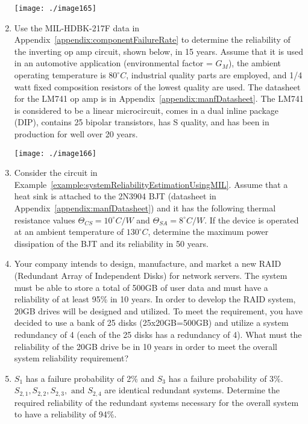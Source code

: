 \begin{enumerate}
\texttt{[image: ./image165]}

\item
  Use the MIL-HDBK-217F data in 
  Appendix~\ref{appendix:componentFailureRate} to determine the reliability
  of the inverting op amp circuit, shown below, in 15 years. Assume that
  it is used in an automotive application (environmental factor =
 $G_M$), the ambient operating temperature is
$80^\circ C$, industrial quality parts are employed, and 1/4
  watt fixed composition resistors of the lowest quality are used. The
  datasheet for the LM741 op amp is in Appendix~\ref{appendix:manfDatasheet}. 
  The LM741 is
  considered to be a linear microcircuit, comes in a dual inline package
  (DIP), contains 25 bipolar transistors, has S quality, and has been in
  production for well over 20 years.

\texttt{[image: ./image166]}

\item
  Consider the circuit in Example~\ref{example:systemReliabilityEstimationUsingMIL}. 
  Assume that a heat sink is
  attached to the 2N3904 BJT (datasheet in 
  Appendix~\ref{appendix:manfDatasheet}) and it has the
  following thermal resistance values
$\Theta_{CS} = 10^\circ C/W$ and $\Theta_{SA} = 8 ^\circ C/W$. 
If the device is operated at
  an ambient temperature of $130^\circ C$, determine the maximum power
  dissipation of the BJT and its reliability in 50 years.
\item
  Your company intends to design, manufacture, and market a new RAID
  (Redundant Array of Independent Disks) for network servers. The system
  must be able to store a total of 500GB of user data and must have a
  reliability of at least 95\% in 10 years. In order to develop the RAID
  system, 20GB drives will be designed and utilized. To meet the
  requirement, you have decided to use a bank of 25 disks
  (25x20GB=500GB) and utilize a system redundancy of 4 (each of the 25
  disks has a redundancy of 4). What must the reliability of the 20GB
  drive be in 10 years in order to meet the overall system reliability
  requirement?
  
  
\item
  $S_1$ has a failure probability of  2\% and $S_3$ has a failure
  probability of 3\%. $S_{2,1}, S_{2,2}, S_{2,3}, \text{ and } S_{2,4}$   
   are identical redundant
  systems. Determine the required reliability of the redundant systems
  necessary for the overall system to have a reliability of 94\%.


\end{enumerate}

